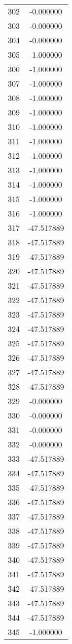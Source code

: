 \documentclass[12pt]{article}
\begin{document}
\begin{longtable}{@{}cc@{}}
302 & -0.000000 \\
303 & -0.000000 \\
304 & -0.000000 \\
305 & -1.000000 \\
306 & -1.000000 \\
307 & -1.000000 \\
308 & -1.000000 \\
309 & -1.000000 \\
310 & -1.000000 \\
311 & -1.000000 \\
312 & -1.000000 \\
313 & -1.000000 \\
314 & -1.000000 \\
315 & -1.000000 \\
316 & -1.000000 \\
317 & -47.517889 \\
318 & -47.517889 \\
319 & -47.517889 \\
320 & -47.517889 \\
321 & -47.517889 \\
322 & -47.517889 \\
323 & -47.517889 \\
324 & -47.517889 \\
325 & -47.517889 \\
326 & -47.517889 \\
327 & -47.517889 \\
328 & -47.517889 \\
329 & -0.000000 \\
330 & -0.000000 \\
331 & -0.000000 \\
332 & -0.000000 \\
333 & -47.517889 \\
334 & -47.517889 \\
335 & -47.517889 \\
336 & -47.517889 \\
337 & -47.517889 \\
338 & -47.517889 \\
339 & -47.517889 \\
340 & -47.517889 \\
341 & -47.517889 \\
342 & -47.517889 \\
343 & -47.517889 \\
344 & -47.517889 \\
345 & -1.000000 \\

\end{longtable}
\end{document}
